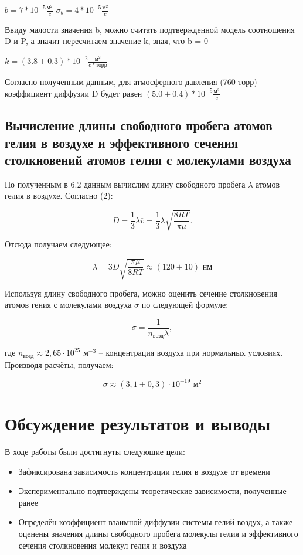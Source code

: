 \documentclass[12pt,a4paper]{article}
\begin{document}
$b = 7*10^{-5} \frac{\text{м}^2}{c}$ \;\;\;\;\; $\sigma_{b} = 4*10^{-5} \frac{\text{м}^2}{c}$

Ввиду малости значения b, можно считать подтвержденной модель соотношения D и P, а значит пересчитаем значение k, зная, что b = 0

$k = (3.8 \pm 0.3) * 10^{-2} \frac{\text{м}^2}{c * \text{торр}}$

Согласно полученным данным, для атмосферного давления (760 торр) коэффициент диффузии D будет равен $(5.0 \pm 0.4)*10^{-5} \frac{\text{м}^2}{c}$

\subsection{Вычисление длины свободного пробега атомов гелия в воздухе и эффективного сечения столкновений атомов гелия с молекулами воздуха}

По полученным в 6.2 данным вычислим длину свободного пробега $ \lambda $ атомов гелия в воздухе. Согласно (2):

\[ D = \frac{1}{3}\lambda \overline{v} = \frac{1}{3}\lambda\sqrt{\frac{8RT}{\pi\mu}}. \]

Отсюда получаем следующее:

\[ \boxed{\lambda = 3D\sqrt{\dfrac{\pi\mu}{8RT}} \approx (120 \pm 10) \text{ нм}}\]

Используя длину свободного пробега, можно оценить сечение столкновения атомов гения с молекулами воздуха $ \sigma $ по следующей формуле:

\[ \sigma = \frac{1}{n_\text{возд}\lambda}, \]

где $ n_\text{возд} \approx 2,65 \cdot 10^{25} $ м$ ^{-3} $ -- концентрация воздуха при нормальных условиях. Производя расчёты, получаем:

\[ \boxed{\sigma \approx (3,1 \pm 0,3) \cdot 10^{-19} \text{ м}^2}\]

\section{Обсуждение результатов и выводы}
В ходе работы были достигнуты следующие цели:
\begin{itemize}
\item Зафиксирована зависимость концентрации гелия в воздухе от времени
\item Экспериментально подтверждены теоретические зависимости, полученные ранее
\item Определён коэффициент взаимной диффузии системы гелий-воздух, а также оценены значения длины свободного пробега молекулы гелия и эффективного сечения столкновения молекул гелия и воздуха
\end{itemize}
\end{document}
